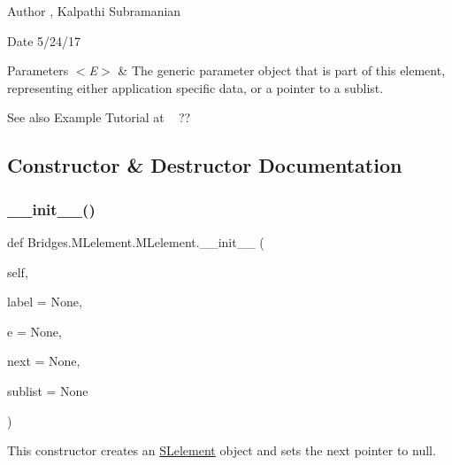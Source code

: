 \begin{DoxyAuthor}{Author}
, Kalpathi Subramanian
\end{DoxyAuthor}
\begin{DoxyDate}{Date}
5/24/17
\end{DoxyDate}

\begin{DoxyParams}{Parameters}
{\em $<$\+E$>$} & The generic parameter object that is part of this element, representing either application specific data, or a pointer to a sublist.\\
\hline
\end{DoxyParams}
\begin{DoxySeeAlso}{See also}
Example Tutorial at ~\newline
 ?? 
\end{DoxySeeAlso}


\subsection{Constructor \& Destructor Documentation}
\mbox{\label{class_bridges_1_1_m_lelement_1_1_m_lelement_adf7e1429b30cbd38b593e4266e795650}} 
\subsubsection{\texorpdfstring{\+\_\+\+\_\+init\+\_\+\+\_\+()}{\_\_init\_\_()}}
{\footnotesize\ttfamily def Bridges.\+M\+Lelement.\+M\+Lelement.\+\_\+\+\_\+init\+\_\+\+\_\+ (\begin{DoxyParamCaption}\item[{}]{self,  }\item[{}]{label = {\ttfamily None},  }\item[{}]{e = {\ttfamily None},  }\item[{}]{next = {\ttfamily None},  }\item[{}]{sublist = {\ttfamily None} }\end{DoxyParamCaption})}



This constructor creates an \mbox{\hyperlink{namespace_bridges_1_1_s_lelement}{S\+Lelement}} object and sets the next pointer to null. 



